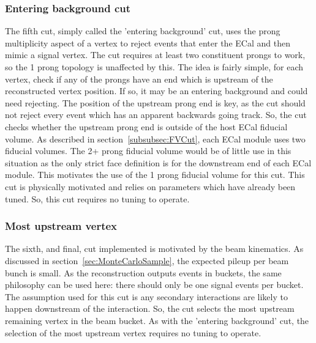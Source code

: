 \subsubsection{Entering background cut}
\label{subsubsec:EnteringBackgroundCut}
The fifth cut, simply called the 'entering background' cut, uses the prong multiplicity aspect of a vertex to reject events that enter the ECal and then mimic a signal vertex.  The cut requires at least two constituent prongs to work, so the 1 prong topology is unaffected by this.  The idea is fairly simple, for each vertex, check if any of the prongs have an end which is upstream of the reconstructed vertex position.  If so, it may be an entering background and could need rejecting.  The position of the upstream prong end is key, as the cut should not reject every event which has an apparent backwards going track.  So, the cut checks whether the upstream prong end is outside of the host ECal fiducial volume.  As described in section~\ref{subsubsec:FVCut}, each ECal module uses two fiducial volumes.  The 2+ prong fiducial volume would be of little use in this situation as the only strict face definition is for the downstream end of each ECal module.  This motivates the use of the 1 prong fiducial volume for this cut.  This cut is physically motivated and relies on parameters which have already been tuned.  So, this cut requires no tuning to operate.

\subsubsection{Most upstream vertex}
\label{subsubsec:MostUpstreamCut}
The sixth, and final, cut implemented is motivated by the beam kinematics.  As discussed in section~\ref{sec:MonteCarloSample}, the expected pileup per beam bunch is small.  As the reconstruction outputs events in buckets, the same philosophy can be used here: there should only be one signal events per bucket.  The assumption used for this cut is any secondary interactions are likely to happen downstream of the interaction.  So, the cut selects the most upstream remaining vertex in the beam bucket.  As with the 'entering background' cut, the selection of the most upstream vertex requires no tuning to operate.


